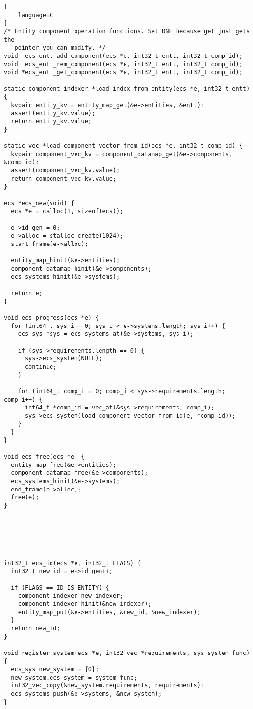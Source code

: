 \begin{lstlisting}[
    language=C
]
/* Entity component operation functions. Set DNE because get just gets the
   pointer you can modify. */
void  ecs_entt_add_component(ecs *e, int32_t entt, int32_t comp_id);
void  ecs_entt_rem_component(ecs *e, int32_t entt, int32_t comp_id);
void *ecs_entt_get_component(ecs *e, int32_t entt, int32_t comp_id);

static component_indexer *load_index_from_entity(ecs *e, int32_t entt) {
  kvpair entity_kv = entity_map_get(&e->entities, &entt);
  assert(entity_kv.value);
  return entity_kv.value;
}

static vec *load_component_vector_from_id(ecs *e, int32_t comp_id) {
  kvpair component_vec_kv = component_datamap_get(&e->components, &comp_id);
  assert(component_vec_kv.value);
  return component_vec_kv.value;
}

ecs *ecs_new(void) {
  ecs *e = calloc(1, sizeof(ecs));

  e->id_gen = 0;
  e->alloc = stalloc_create(1024);
  start_frame(e->alloc);

  entity_map_hinit(&e->entities);
  component_datamap_hinit(&e->components);
  ecs_systems_hinit(&e->systems);

  return e;
}

void ecs_progress(ecs *e) {
  for (int64_t sys_i = 0; sys_i < e->systems.length; sys_i++) {
    ecs_sys *sys = ecs_systems_at(&e->systems, sys_i);

    if (sys->requirements.length == 0) {
      sys->ecs_system(NULL);
      continue;
    }

    for (int64_t comp_i = 0; comp_i < sys->requirements.length; comp_i++) {
      int64_t *comp_id = vec_at(&sys->requirements, comp_i);
      sys->ecs_system(load_component_vector_from_id(e, *comp_id));
    }
  }
}

void ecs_free(ecs *e) {
  entity_map_free(&e->entities);
  component_datamap_free(&e->components);
  ecs_systems_hinit(&e->systems);
  end_frame(e->alloc);
  free(e);
}






int32_t ecs_id(ecs *e, int32_t FLAGS) {
  int32_t new_id = e->id_gen++;

  if (FLAGS == ID_IS_ENTITY) {
    component_indexer new_indexer;
    component_indexer_hinit(&new_indexer);
    entity_map_put(&e->entities, &new_id, &new_indexer);
  }
  return new_id;
}

void register_system(ecs *e, int32_vec *requirements, sys system_func) {
  ecs_sys new_system = {0};
  new_system.ecs_system = system_func;
  int32_vec_copy(&new_system.requirements, requirements);
  ecs_systems_push(&e->systems, &new_system);
}


\end{lstlisting}
